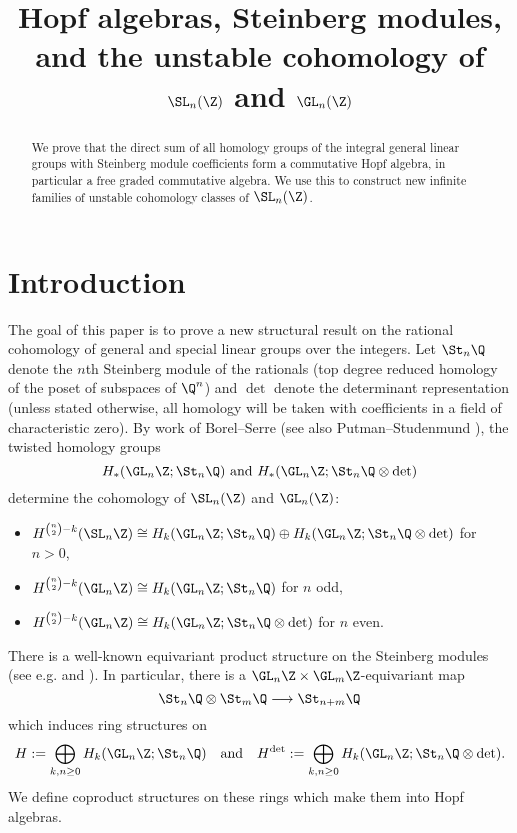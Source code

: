 
\title{Hopf algebras, Steinberg modules, and the unstable cohomology of $\SL_n(\Z)$ and $\GL_n(\Z)$}
\begin{abstract} 
We prove that the direct sum of all homology groups of the integral general linear groups with Steinberg module coefficients form a commutative Hopf algebra, in particular a free graded commutative algebra. We use this to construct new infinite families of unstable cohomology classes of $\SL_n(\Z)$.
\end{abstract}
\maketitle





\section{Introduction}

The goal of this paper is to prove a new structural result on the rational cohomology of general and special linear groups over the integers. Let $\St_n \Q$ denote the $n$th Steinberg module of the rationals (top degree reduced homology of the poset of subspaces of $\Q^n$) and $\det$ denote the determinant representation (unless stated otherwise, all homology will be taken with coefficients in a field of characteristic zero). By work of Borel--Serre \cite{BoSe} (see also Putman--Studenmund \cite{PutStu}), the twisted homology groups \[H_*(\GL_n \Z ;\St_n\Q) \text{ and } H_*(\GL_n \Z ;\St_n \Q \otimes \det) \] determine the cohomology  of $\SL_n(\Z)$ and $\GL_n(\Z)$:
\begin{itemize}
\item 
$H^{\binom n2 - k}(\SL_n \Z) \cong H_k(\GL_n \Z; \St_n \Q) \oplus  H_k(\GL_n \Z; \St_n \Q  \otimes \det)$ for $n>0$,
\item $H^{\binom n2 - k}(\GL_n \Z) \cong H_k(\GL_n \Z; \St_n \Q)$ for $n$ odd,
\item $H^{\binom n2 - k}(\GL_n \Z) \cong H_k(\GL_n \Z; \St_n \Q \otimes \det)$ for $n$ even.

\end{itemize}

There is a well-known equivariant product structure on the Steinberg modules (see e.g. \cite{MNP} and \cite{MPW}). In particular, there is a $\GL_n \Z \times \GL_m \Z$-equivariant map
\begin{equation}\label{Steinbergmult}
\St_n \Q \otimes \St_m \Q \longrightarrow \St_{n+m}\Q
\end{equation}
which induces ring structures on \[ H := \bigoplus_{k,n \ge 0} H_k(\GL_n \Z; \St_n \Q)\quad\text{and}\quad H^{\det} :=\bigoplus_{k,n \ge 0} H_k(\GL_n \Z;  \St_n \Q\otimes \det).\] We define coproduct structures on these rings which make them into Hopf algebras.

